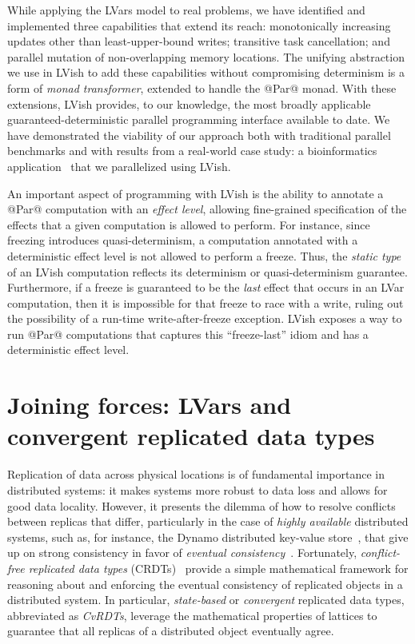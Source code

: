 \documentclass{article}
\begin{document}
While applying the LVars model to real problems, we have identified
and implemented three capabilities that extend its reach:
monotonically increasing updates other than least-upper-bound writes;
transitive task cancellation; and parallel mutation of non-overlapping
memory locations. The unifying abstraction we use in LVish to add
these capabilities without compromising determinism is a form of
\emph{monad transformer}, extended to handle the @Par@ monad.  With
these extensions, LVish provides, to our knowledge, the most broadly
applicable guaranteed-deterministic parallel programming interface
available to date. We have demonstrated the viability of our approach
both with traditional parallel benchmarks and with results from a
real-world case study: a bioinformatics application~\cite{phybin} that
we parallelized using LVish.

An important aspect of programming with LVish is the ability to
annotate a @Par@ computation with an \emph{effect level}, allowing
fine-grained specification of the effects that a given computation is
allowed to perform.  For instance, since freezing introduces
quasi-determinism, a computation annotated with a deterministic effect
level is not allowed to perform a freeze.  Thus, the \emph{static
  type} of an LVish computation reflects its determinism or
quasi-determinism guarantee.  Furthermore, if a freeze is guaranteed
to be the \emph{last} effect that occurs in an LVar computation, then
it is impossible for that freeze to race with a write, ruling out the
possibility of a run-time write-after-freeze exception.  LVish exposes
a way to run @Par@ computations that captures this ``freeze-last''
idiom and has a deterministic effect level.

\section{Joining forces: LVars and convergent replicated data types}\label{crdts}

Replication of data across physical locations is of fundamental
importance in distributed systems: it makes systems more robust to
data loss and allows for good data locality.  However, it presents the
dilemma of how to resolve conflicts between replicas that differ,
particularly in the case of \emph{highly available} distributed
systems, such as, for instance, the Dynamo distributed key-value
store~\cite{dynamo}, that give up on strong consistency in favor of
\emph{eventual consistency}~\cite{vogels-ec}.  Fortunately,
\emph{conflict-free replicated data types} (CRDTs)~\cite{crdts}
provide a simple mathematical framework for reasoning about and
enforcing the eventual consistency of replicated objects in a
distributed system.  In particular, \emph{state-based} or
\emph{convergent} replicated data types, abbreviated as \emph{CvRDTs},
leverage the mathematical properties of lattices to guarantee that all
replicas of a distributed object eventually agree.
\end{document}
